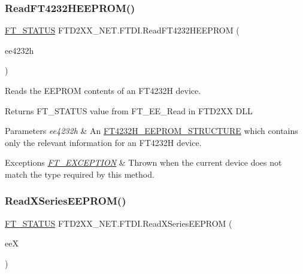 \subsubsection{\texorpdfstring{ReadFT4232HEEPROM()}{ReadFT4232HEEPROM()}}
{\footnotesize\ttfamily \mbox{\hyperlink{class_f_t_d2_x_x___n_e_t_1_1_f_t_d_i_aabe20ad905cc4ccc1e35dd5b877d9a83}{F\+T\+\_\+\+S\+T\+A\+T\+US}} F\+T\+D2\+X\+X\+\_\+\+N\+E\+T.\+F\+T\+D\+I.\+Read\+F\+T4232\+H\+E\+E\+P\+R\+OM (\begin{DoxyParamCaption}\item[{\mbox{\hyperlink{class_f_t_d2_x_x___n_e_t_1_1_f_t_d_i_1_1_f_t4232_h___e_e_p_r_o_m___s_t_r_u_c_t_u_r_e}{F\+T4232\+H\+\_\+\+E\+E\+P\+R\+O\+M\+\_\+\+S\+T\+R\+U\+C\+T\+U\+RE}}}]{ee4232h }\end{DoxyParamCaption})}



Reads the E\+E\+P\+R\+OM contents of an F\+T4232H device. 

\begin{DoxyReturn}{Returns}
F\+T\+\_\+\+S\+T\+A\+T\+US value from F\+T\+\_\+\+E\+E\+\_\+\+Read in F\+T\+D2\+XX D\+LL
\end{DoxyReturn}

\begin{DoxyParams}{Parameters}
{\em ee4232h} & An \mbox{\hyperlink{class_f_t_d2_x_x___n_e_t_1_1_f_t_d_i_1_1_f_t4232_h___e_e_p_r_o_m___s_t_r_u_c_t_u_r_e}{F\+T4232\+H\+\_\+\+E\+E\+P\+R\+O\+M\+\_\+\+S\+T\+R\+U\+C\+T\+U\+RE}} which contains only the relevant information for an F\+T4232H device.\\
\hline
\end{DoxyParams}

\begin{DoxyExceptions}{Exceptions}
{\em \mbox{\hyperlink{class_f_t_d2_x_x___n_e_t_1_1_f_t_d_i_1_1_f_t___e_x_c_e_p_t_i_o_n}{F\+T\+\_\+\+E\+X\+C\+E\+P\+T\+I\+ON}}} & Thrown when the current device does not match the type required by this method.\\
\hline
\end{DoxyExceptions}
\mbox{\label{class_f_t_d2_x_x___n_e_t_1_1_f_t_d_i_afd2110e4367ed40d47ab60289ee99547}} 
\subsubsection{\texorpdfstring{ReadXSeriesEEPROM()}{ReadXSeriesEEPROM()}}
{\footnotesize\ttfamily \mbox{\hyperlink{class_f_t_d2_x_x___n_e_t_1_1_f_t_d_i_aabe20ad905cc4ccc1e35dd5b877d9a83}{F\+T\+\_\+\+S\+T\+A\+T\+US}} F\+T\+D2\+X\+X\+\_\+\+N\+E\+T.\+F\+T\+D\+I.\+Read\+X\+Series\+E\+E\+P\+R\+OM (\begin{DoxyParamCaption}\item[{\mbox{\hyperlink{class_f_t_d2_x_x___n_e_t_1_1_f_t_d_i_1_1_f_t___x_s_e_r_i_e_s___e_e_p_r_o_m___s_t_r_u_c_t_u_r_e}{F\+T\+\_\+\+X\+S\+E\+R\+I\+E\+S\+\_\+\+E\+E\+P\+R\+O\+M\+\_\+\+S\+T\+R\+U\+C\+T\+U\+RE}}}]{eeX }\end{DoxyParamCaption})}



